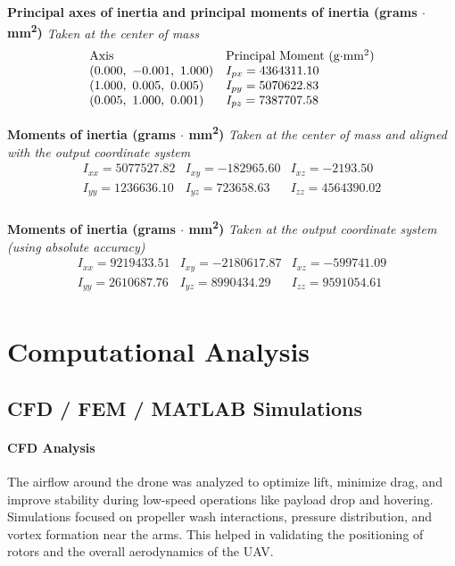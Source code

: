 \documentclass[12pt]{report}
\begin{document}
\vspace{1em}
\textbf{Principal axes of inertia and principal moments of inertia (grams $\cdot$ mm\textsuperscript{2})}  
\textit{Taken at the center of mass}  
\[
\begin{array}{lll}
\text{Axis} & \text{Principal Moment (g$\cdot$mm\textsuperscript{2})} \\
( 0.000,\ -0.001,\ 1.000 ) & I_{px} = 4364311.10 \\
( 1.000,\ 0.005,\ 0.005 ) & I_{py} = 5070622.83 \\
( 0.005,\ 1.000,\ 0.001 ) & I_{pz} = 7387707.58 \\
\end{array}
\]

\vspace{1em}
\textbf{Moments of inertia (grams $\cdot$ mm\textsuperscript{2})}  
\textit{Taken at the center of mass and aligned with the output coordinate system}  
\[
\begin{array}{llll}
I_{xx} = 5077527.82 & I_{xy} = -182965.60 & I_{xz} = -2193.50 \\
I_{yy} = 1236636.10 & I_{yz} = 723658.63 & I_{zz} = 4564390.02 \\
\end{array}
\]

\vspace{1em}
\textbf{Moments of inertia (grams $\cdot$ mm\textsuperscript{2})}  
\textit{Taken at the output coordinate system (using absolute accuracy)}  
\[
\begin{array}{llll}
I_{xx} = 9219433.51 & I_{xy} = -2180617.87 & I_{xz} = -599741.09 \\
I_{yy} = 2610687.76 & I_{yz} = 8990434.29 & I_{zz} = 9591054.61 \\
\end{array}
\]

  \chapter{Computational Analysis}
    \section{CFD / FEM / MATLAB Simulations}
    \subsubsection{\large CFD Analysis}
    The airflow around the drone was analyzed to optimize lift, minimize drag, and improve stability during low-speed operations like payload drop and hovering. Simulations focused on propeller wash interactions, pressure distribution, and vortex formation near the arms. This helped in validating the positioning of rotors and the overall aerodynamics of the UAV.
\end{document}
